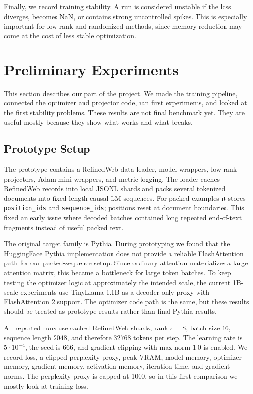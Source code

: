 \documentclass[conference]{IEEEtran}
\begin{document}
Finally, we record training stability. A run is considered unstable if the loss diverges, becomes NaN, or contains strong uncontrolled spikes. This is especially important for low-rank and randomized methods, since memory reduction may come at the cost of less stable optimization.

\section{Preliminary Experiments}

This section describes our part of the project. We made the training pipeline, connected the optimizer and projector code, ran first experiments, and looked at the first stability problems. These results are not final benchmark yet. They are useful mostly because they show what works and what breaks.

\subsection{Prototype Setup}

The prototype contains a RefinedWeb data loader, model wrappers, low-rank projectors, Adam-mini wrappers, and metric logging. The loader caches RefinedWeb records into local JSONL shards and packs several tokenized documents into fixed-length causal LM sequences. For packed examples it stores \texttt{position\_ids} and \texttt{sequence\_ids}; positions reset at document boundaries. This fixed an early issue where decoded batches contained long repeated end-of-text fragments instead of useful packed text.

The original target family is Pythia. During prototyping we found that the HuggingFace Pythia implementation does not provide a reliable FlashAttention path for our packed-sequence setup. Since ordinary attention materializes a large attention matrix, this became a bottleneck for large token batches. To keep testing the optimizer logic at approximately the intended scale, the current 1B-scale experiments use TinyLlama-1.1B as a decoder-only proxy with FlashAttention 2 support. The optimizer code path is the same, but these results should be treated as prototype results rather than final Pythia results.

All reported runs use cached RefinedWeb shards, rank $r=8$, batch size $16$, sequence length $2048$, and therefore $32768$ tokens per step. The learning rate is $5 \cdot 10^{-4}$, the seed is $666$, and gradient clipping with max norm $1.0$ is enabled. We record loss, a clipped perplexity proxy, peak VRAM, model memory, optimizer memory, gradient memory, activation memory, iteration time, and gradient norms. The perplexity proxy is capped at 1000, so in this first comparison we mostly look at training loss.
\end{document}

